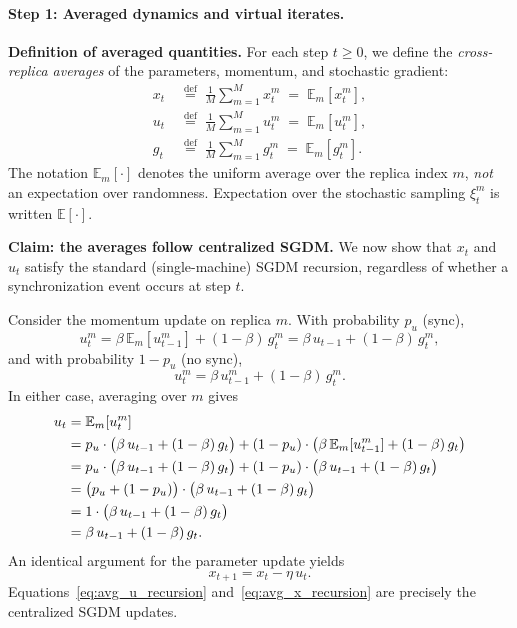 \documentclass{article}
\begin{document}
\paragraph{Step 1: Averaged dynamics and virtual iterates.}

\noindent\textbf{Definition of averaged quantities.}
For each step $t \geq 0$, we define the \emph{cross-replica averages} of the
parameters, momentum, and stochastic gradient:
\begin{align}
x_t &\;\stackrel{\text{def}}{=}\; \frac{1}{M}\sum_{m=1}^{M} x_t^m
     \;=\; \mathbb{E}_m[x_t^m], \label{eq:avg_x} \\[4pt]
u_t &\;\stackrel{\text{def}}{=}\; \frac{1}{M}\sum_{m=1}^{M} u_t^m
     \;=\; \mathbb{E}_m[u_t^m], \label{eq:avg_u} \\[4pt]
g_t &\;\stackrel{\text{def}}{=}\; \frac{1}{M}\sum_{m=1}^{M} g_t^m
     \;=\; \mathbb{E}_m[g_t^m]. \label{eq:avg_g}
\end{align}
The notation $\mathbb{E}_m[\cdot]$ denotes the uniform average over the
replica index $m$, \emph{not} an expectation over randomness. Expectation
over the stochastic sampling $\xi_t^m$ is written $\mathbb{E}[\cdot]$.

\medskip
\noindent\textbf{Claim: the averages follow centralized SGDM.}
We now show that $x_t$ and $u_t$ satisfy the standard (single-machine) SGDM
recursion, regardless of whether a synchronization event occurs at step $t$.

Consider the momentum update on replica $m$. With probability $p_u$ (sync),
\[
u_t^m = \beta\,\mathbb{E}_m[u_{t-1}^m] + (1-\beta)\,g_t^m
       = \beta\,u_{t-1} + (1-\beta)\,g_t^m,
\]
and with probability $1-p_u$ (no sync),
\[
u_t^m = \beta\,u_{t-1}^m + (1-\beta)\,g_t^m.
\]
In either case, averaging over $m$ gives
\begin{align}
u_t &= \mathbb{E}_m[u_t^m] \notag \\
    &= p_u \cdot \bigl(\beta\,u_{t-1} + (1-\beta)\,g_t\bigr)
       + (1-p_u) \cdot \bigl(\beta\,\mathbb{E}_m[u_{t-1}^m]
       + (1-\beta)\,g_t\bigr) \notag \\
    &= p_u \cdot \bigl(\beta\,u_{t-1} + (1-\beta)\,g_t\bigr)
       + (1-p_u) \cdot \bigl(\beta\,u_{t-1}
       + (1-\beta)\,g_t\bigr) \notag \\
    &= \bigl(p_u + (1-p_u)\bigr) \cdot
       \bigl(\beta\,u_{t-1} + (1-\beta)\,g_t\bigr) \notag \\
    &= 1 \cdot \bigl(\beta\,u_{t-1} + (1-\beta)\,g_t\bigr) \notag \\
    &= \beta\,u_{t-1} + (1-\beta)\,g_t. \label{eq:avg_u_recursion}
\end{align}
An identical argument for the parameter update yields
\begin{equation}
x_{t+1} = x_t - \eta\,u_t. \label{eq:avg_x_recursion}
\end{equation}
Equations~\eqref{eq:avg_u_recursion} and~\eqref{eq:avg_x_recursion} are
precisely the centralized SGDM updates.
\end{document}
